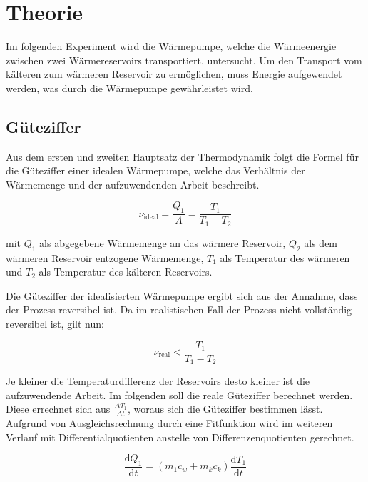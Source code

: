 \section{Theorie}
\label{sec:Theorie}

Im folgenden Experiment wird die Wärmepumpe, welche die Wärmeenergie zwischen zwei Wärmereservoirs transportiert, untersucht. Um den Transport vom kälteren zum wärmeren Reservoir zu ermöglichen, muss Energie aufgewendet werden, was durch die Wärmepumpe gewährleistet wird.

\subsection{Güteziffer}
Aus dem ersten und zweiten Hauptsatz der Thermodynamik folgt die Formel für die Güteziffer einer idealen Wärmepumpe, welche das Verhältnis der Wärmemenge und der aufzuwendenden Arbeit beschreibt.

\begin{equation}
\label{eqn:güte_ideal}
ν_{\mathrm{ideal}} = \frac{Q_{1}}{A} = \frac{T_{1}}{T_{1}-T_{2}}
\end{equation}

mit $Q_{1}$ als abgegebene Wärmemenge an das wärmere Reservoir, $Q_{2}$ als dem wärmeren Reservoir entzogene Wärmemenge, $T_{1}$ als Temperatur des wärmeren und $T_{2}$ als Temperatur des kälteren Reservoirs.

Die Güteziffer der idealisierten Wärmepumpe ergibt sich aus der Annahme, dass der Prozess reversibel ist. Da im realistischen Fall der Prozess nicht vollständig reversibel ist, gilt nun:

\begin{equation}
ν_{\mathrm{real}} < \frac{T_{1}}{T_{1} - T_{2}}
\end{equation}

Je kleiner die Temperaturdifferenz der Reservoirs desto kleiner ist die aufzuwendende Arbeit.
Im folgenden soll die reale Güteziffer berechnet werden. Diese errechnet sich aus $\frac{\Delta T_{1}}{\Delta t}$, woraus sich die Güteziffer bestimmen lässt.
Aufgrund von Ausgleichsrechnung durch eine Fitfunktion wird im weiteren Verlauf mit Differentialquotienten anstelle von Differenzenquotienten gerechnet.

\begin{equation}
\label{eqn:güteziffer1}
\frac{\mathrm{d}Q_{1}}{\mathrm{d}t} = (m_{1} c_w + m_k c_k)\frac {\mathrm{d}T_{1}}{\mathrm{d}t}
\end{equation}

